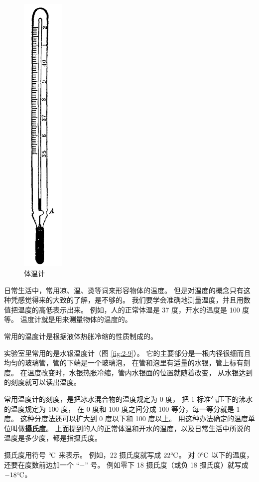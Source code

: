 \begin{figure}
\begin{minipage}{2.5cm}
    \includegraphics[width=2cm]{../pic/czwl2-ch2-10}
    \caption{体温计}\label{fig:2-10}
    \end{minipage}
\end{figure}


日常生活中，常用凉、温、烫等词来形容物体的温度。
但是对温度的概念只有这种凭感觉得来的大致的了解，是不够的。
我们要学会准确地测量温度，并且用数值把温度的高低表示出来。
例如，人的正常体温是 37 度，开水的温度是 100 度等。
温度计就是用来测量物体的温度的。

常用的温度计是根据液体热胀冷缩的性质制成的。

实验室里常用的是水银温度计（图 \ref{fig:2-9}）。
它的主要部分是一根内径很细而且均匀的玻璃管，管的下端是一个玻璃泡，
在管和泡里有适量的水银，管上标有刻度。
在温度改变时，水银热胀冷缩，管内水银面的位置就随着改变，
从水银达到的刻度就可以读出温度。

常用温度计的刻度，是把冰水混合物的温度规定为 0 度，
把 1 标准气压下的沸水的温度规定为 100 度，
在 0 度和 100 度之间分成 100 等分，每一等分就是 1 度。
这种分度法还可以扩大到 0 度以下和 100 度以上。
用这种办法确定的温度单位叫做\textbf{攝氏度}。
上面提到的人的正常体温和开水的温度，以及日常生活中所说的温度是多少度，都是指摄氏度。

摄氏度用符号 $\celsius$ 来表示。
例如，22 摄氏度就写成 $22\celsius$。
对 $0\celsius$ 以下的温度，还要在度数前边加一个 “$-$” 号。
例如零下 18 摄氏度（或负 18 摄氏度）就写成 $-18\celsius$。

